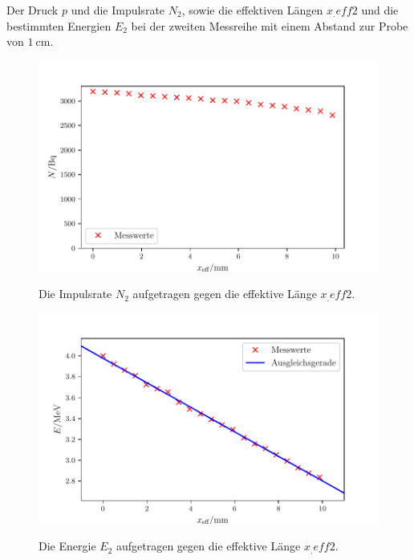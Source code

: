 \begin{table}
	\centering
	\caption{Der Druck $p$ und die Impulsrate $N_2$, sowie die effektiven Längen $x_.{eff2}$ und die bestimmten Energien $E_2$ bei der zweiten Messreihe mit einem Abstand zur Probe von $\SI{1}{\centi\metre}$.}
	
	\label{tab:2}
\end{table}
\begin{figure}
	\centering
	\caption{Die Impulsrate $N_2$ aufgetragen gegen die effektive Länge $x_.{eff2}$.}
	\includegraphics[width=\linewidth-70pt,height=\textheight-70pt,keepaspectratio]{content/images/Graph2N.pdf}
	\label{fig:2N}
\end{figure}
\begin{figure}
	\centering
	\caption{Die Energie $E_2$ aufgetragen gegen die effektive Länge $x_.{eff2}$.}
	\includegraphics[width=\linewidth-70pt,height=\textheight-70pt,keepaspectratio]{content/images/Graph2E.pdf}
	\label{fig:2E}
\end{figure}

